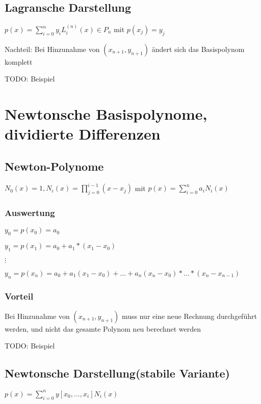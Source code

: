 \documentclass[12pt,a4paper]{article} %
\begin{document}
		\subsection{Lagransche Darstellung}
		
		$p(x) = \sum_{i = 0}^{n}y_iL_i^{(n)}(x) \in P_n$ mit $p(x_j) = y_j$
		
		Nachteil: Bei Hinzunahme von $(x_{n+1}, y_{n+1})$ ändert sich das Basispolynom komplett
		
		
		TODO: Beispiel
		
		\newpage
		
		\section{Newtonsche Basispolynome, dividierte Differenzen}
		
		\subsection{Newton-Polynome}
		
		$N_0(x) = 1, N_i(x) = \prod_{j = 0}^{i - 1}(x - x_j)$ mit $p(x) = \sum_{i = 0}^{n}a_iN_i(x)$
		
		\subsubsection{Auswertung}
		
		$y_0 = p(x_0) = a_0$
		
		$y_1 = p(x_1) = a_0 + a_1 * (x_1 - x_0)$
		
		$\vdots$
		
		$y_n = p(x_n) = a_0 + a_1(x_1 - x_0) + ... + a_n(x_n - x_0) * ... * (x_n - x_{n - 1})$
		
		\subsubsection{Vorteil}
		
		Bei Hinzunahme von $(x_{n + 1}, y_{n + 1})$ muss nur eine neue Rechnung durchgeführt werden, und nicht das gesamte Polynom neu berechnet werden
		
		TODO: Beispiel
		
		\subsection[Newtonsche Darstellung]{Newtonsche Darstellung(stabile Variante)}
		
		$p(x) = \sum_{i = 0}^{n}y[x_0, ..., x_i] N_i(x)$
		
\end{document}
